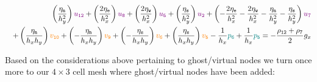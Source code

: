 \begin{eqnarray}
&&
\left( \frac{\eta_{\tt n}}{h_y^2} \right) {\color{violet} u_{\tt 12}} + 
\left( \frac{2\eta_{\tt e}}{h_x^2} \right) {\color{violet} u_{\tt 8}} + 
\left( \frac{2\eta_{\tt w}}{h_x^2} \right) {\color{violet} u_{\tt 5}} + 
\left( \frac{\eta_{\tt s}}{h_y^2} \right) {\color{violet} u_{\tt 2}} + 
\left( -\frac{2\eta_{\tt e}}{h_x^2} -\frac{2\eta_{\tt w}}{h_x^2}  
-\frac{\eta_{\tt n}}{h_y^2} -\frac{\eta_{\tt s}}{h_y^2}  
\right) {\color{violet} u_7} \nonumber\\
&&+
\left( \frac{\eta_{\tt n}}{h_x h_y} \right) {\color{orange} v_{\tt 10}}+ 
\left(-\frac{\eta_{\tt n}}{h_x h_y} \right) {\color{orange} v_{\tt 9}}+ 
\left(-\frac{\eta_{\tt s}}{h_x h_y} \right) {\color{orange} v_{\tt 6}}+ 
\left( \frac{\eta_{\tt s}}{h_x h_y} \right) {\color{orange} v_{\tt 5}} 
- \frac{1}{h_x} {\color{teal}p_{\tt 6}} + \frac{1}{h_x} {\color{teal}p_{\tt 5}} = -\frac{\rho_{\tt 12}+\rho_{\tt 7}}{2} g_x 
\nonumber
\end{eqnarray}





Based on the considerations above pertaining to ghost/virtual nodes
we turn once more to our $4\times 3$ cell mesh where ghost/virtual nodes have been added:



